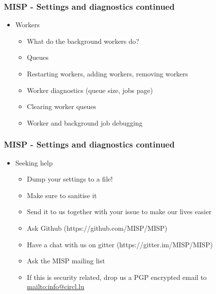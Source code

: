 \begin{frame}
    \frametitle{MISP - Settings and diagnostics continued}
        \begin{itemize}
        \item Workers
        \begin{itemize}
            \item What do the background workers do?
            \item Queues
            \item Restarting workers, adding workers, removing workers
            \item Worker diagnostics (queue size, jobs page)
            \item Clearing worker queues
            \item Worker and background job debugging
        \end{itemize}
        \end{itemize}
\end{frame}

\begin{frame}
    \frametitle{MISP - Settings and diagnostics continued}
    \begin{itemize}
        \item Seeking help
        \begin{itemize}
            \item Dump your settings to a file!
            \item Make sure to sanitise it
            \item Send it to us together with your issue to make our lives easier
            \item Ask Github (https://github.com/MISP/MISP)
            \item Have a chat with us on gitter (https://gitter.im/MISP/MISP)
            \item Ask the MISP mailing list
            \item If this is security related, drop us a PGP encrypted email to \url{mailto:info@circl.lu}
        \end{itemize}
    \end{itemize}
\end{frame}

